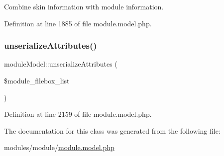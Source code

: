 Combine skin information with module information. 



Definition at line 1885 of file module.\+model.\+php.

\mbox{\label{classmoduleModel_a60ec88f0d61e7a44887bebba8048a18d}} 
\subsubsection{\texorpdfstring{unserialize\+Attributes()}{unserializeAttributes()}}
{\footnotesize\ttfamily module\+Model\+::unserialize\+Attributes (\begin{DoxyParamCaption}\item[{}]{\$module\+\_\+filebox\+\_\+list }\end{DoxyParamCaption})}



Definition at line 2159 of file module.\+model.\+php.



The documentation for this class was generated from the following file\+:\begin{DoxyCompactItemize}
\item 
modules/module/\hyperlink{module_8model_8php}{module.\+model.\+php}\end{DoxyCompactItemize}
